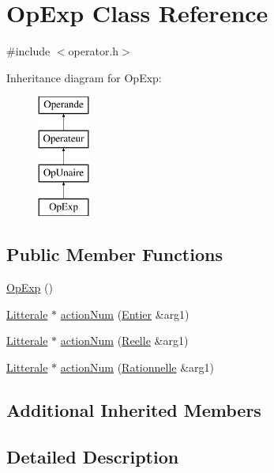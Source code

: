 \hypertarget{class_op_exp}{}\section{Op\+Exp Class Reference}
\label{class_op_exp}


{\ttfamily \#include $<$operator.\+h$>$}

Inheritance diagram for Op\+Exp\+:\begin{figure}[H]
\begin{center}
\leavevmode
\includegraphics[height=4.000000cm]{class_op_exp}
\end{center}
\end{figure}
\subsection*{Public Member Functions}
\begin{DoxyCompactItemize}
\item 
\hyperlink{class_op_exp_a3b16f95195fab7d0989a9b085759b81e}{Op\+Exp} ()
\item 
\hyperlink{class_litterale}{Litterale} $\ast$ \hyperlink{class_op_exp_a2a7a7e5e698b864749b50b2e33b367fb}{action\+Num} (\hyperlink{class_entier}{Entier} \&arg1)
\item 
\hyperlink{class_litterale}{Litterale} $\ast$ \hyperlink{class_op_exp_ad4ea20ea7b9f02c76eb3a6bdb4455161}{action\+Num} (\hyperlink{class_reelle}{Reelle} \&arg1)
\item 
\hyperlink{class_litterale}{Litterale} $\ast$ \hyperlink{class_op_exp_a1d9e0f1afadd3eeab315b930f250b62e}{action\+Num} (\hyperlink{class_rationnelle}{Rationnelle} \&arg1)
\end{DoxyCompactItemize}
\subsection*{Additional Inherited Members}


\subsection{Detailed Description}


